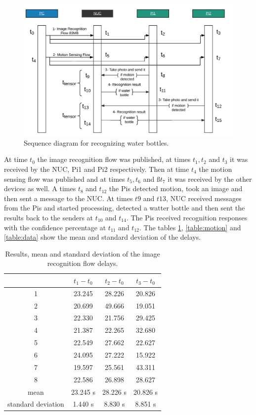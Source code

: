 \begin{figure}[H]
	\centering
	\includegraphics[scale=0.45]{images/sequence-diagram.png}
	\caption{Sequence diagram for recognizing water bottles.}
	\label{fig:sd-tensor}
\end{figure} 
 


\noindent At time $t_0$ the image recognition flow was published, at times $t_1, t_2$ and   $t_3$ it was received by the NUC, Pi1 and Pi2 respectively. Then at time $t_4$ the motion sensing flow was published and at times $t_5,t_6$ and $ßt_7$ it was received by the other devices as well. A times $t_8$ and $t_{12}$  the Pis detected motion, took an image and then sent a message to the NUC. At times $t9$ and $t{13}$,  NUC received messages from the Pis and started processing, detected a watter bottle and then sent the  results back to the senders at $t_{10}$ and $t_{14}$. The Pis received recognition responses with the confidence percentage at $t_{11}$ and $t_{12}$.  The tables \ref{table:tensor}, \ref{table:motion} and \ref{table:data} show the mean and standard deviation of the delays.  
\begin{table}[H]
\centering
\begin{tabular}{*{4}{c}}\toprule
&$t_1 - t_0$  & $t_2 - t_0$  & $t_3-t_0$ \\ \midrule
1&	23.245&	28.226&	20.826\\
2&	20.699&	49.666&	19.051\\
3&	22.330&	21.756&	29.425\\
4&	21.387&	22.265&	32.680\\
5&	22.549&	27.662&	22.627\\
6&	24.095&	27.222&	15.922\\
7&	19.597&	25.561&	43.311\\
8&	22.586&	26.898&	28.627\\
mean&	23.245 s&28.226 s&20.826 s\\ 
standard deviation &1.440 s&8.830 s&8.851 s\\
\end{tabular}
\caption{Results, mean and standard deviation of the image recognition flow delays.}
\label{table:tensor}
\end{table}


